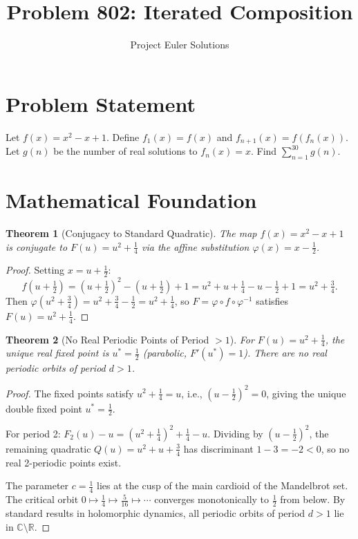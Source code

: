 \documentclass[11pt]{article}
\title{Problem 802: Iterated Composition}
\author{Project Euler Solutions}
\date{}
\newtheorem{theorem}{Theorem}
\begin{document}
\maketitle

\section{Problem Statement}

Let $f(x) = x^2 - x + 1$. Define $f_1(x) = f(x)$ and $f_{n+1}(x) = f(f_n(x))$. Let $g(n)$ be the number of real solutions to $f_n(x) = x$. Find $\displaystyle\sum_{n=1}^{30} g(n)$.

\section{Mathematical Foundation}

\begin{theorem}[Conjugacy to Standard Quadratic]
The map $f(x) = x^2 - x + 1$ is conjugate to $F(u) = u^2 + \frac{1}{4}$ via the affine substitution $\varphi(x) = x - \frac{1}{2}$.
\end{theorem}

\begin{proof}
Setting $x = u + \frac{1}{2}$:
\[
f\!\left(u + \tfrac{1}{2}\right) = \left(u + \tfrac{1}{2}\right)^2 - \left(u + \tfrac{1}{2}\right) + 1 = u^2 + u + \tfrac{1}{4} - u - \tfrac{1}{2} + 1 = u^2 + \tfrac{3}{4}.
\]
Then $\varphi\!\left(u^2 + \tfrac{3}{4}\right) = u^2 + \tfrac{3}{4} - \tfrac{1}{2} = u^2 + \tfrac{1}{4}$, so $F = \varphi \circ f \circ \varphi^{-1}$ satisfies $F(u) = u^2 + \tfrac{1}{4}$.
\end{proof}

\begin{theorem}[No Real Periodic Points of Period $> 1$]
For $F(u) = u^2 + \frac{1}{4}$, the unique real fixed point is $u^* = \frac{1}{2}$ (parabolic, $F'(u^*) = 1$). There are no real periodic orbits of period $d > 1$.
\end{theorem}

\begin{proof}
The fixed points satisfy $u^2 + \frac{1}{4} = u$, i.e., $(u - \frac{1}{2})^2 = 0$, giving the unique double fixed point $u^* = \frac{1}{2}$.

For period 2: $F_2(u) - u = (u^2 + \frac{1}{4})^2 + \frac{1}{4} - u$. Dividing by $(u - \frac{1}{2})^2$, the remaining quadratic $Q(u) = u^2 + u + \frac{3}{4}$ has discriminant $1 - 3 = -2 < 0$, so no real 2-periodic points exist.

The parameter $c = \frac{1}{4}$ lies at the cusp of the main cardioid of the Mandelbrot set. The critical orbit $0 \mapsto \frac{1}{4} \mapsto \frac{5}{16} \mapsto \cdots$ converges monotonically to $\frac{1}{2}$ from below. By standard results in holomorphic dynamics, all periodic orbits of period $d > 1$ lie in $\mathbb{C} \setminus \mathbb{R}$.
\end{proof}
\end{document}
